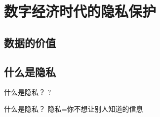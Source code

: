 \documentclass[11pt]{beamer}
\begin{document}
\section{数字经济时代的隐私保护}

\subsection{数据的价值}

\subsection{什么是隐私}

\begin{frame}{什么是隐私？}
	\centering	
	{\huge ?}
\end{frame}

\begin{frame}{什么是隐私？}
	\centering
	{\large 隐私=你不想让别人知道的信息}
\end{frame}
\end{document}
